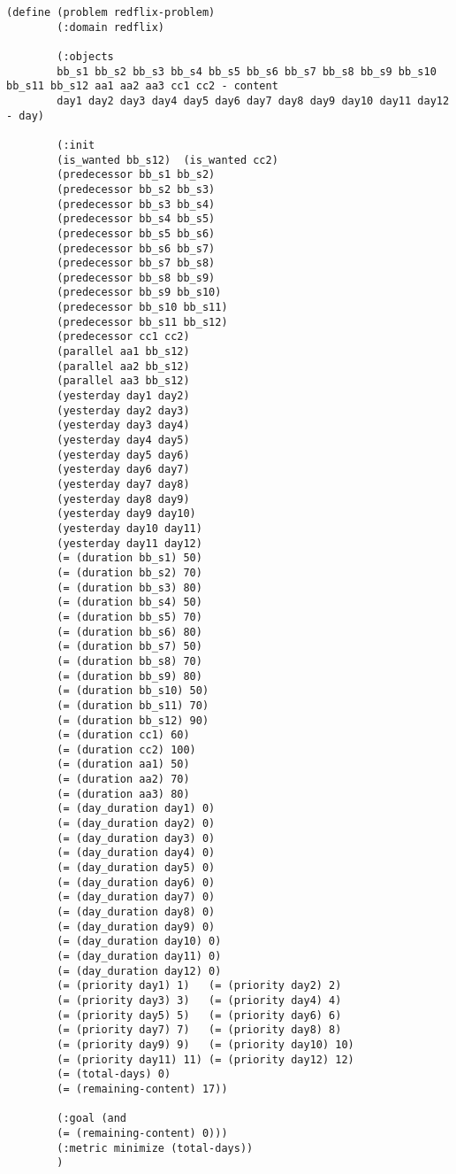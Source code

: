 \documentclass[a4paper]{article}
\begin{document}
	\begin{lstlisting}[language=PDDL, caption={Joc de Prova 1 - Extensió 4
		}, label={lst:JP14}]                     
		(define (problem redflix-problem)
		(:domain redflix)
		
		(:objects
		bb_s1 bb_s2 bb_s3 bb_s4 bb_s5 bb_s6 bb_s7 bb_s8 bb_s9 bb_s10 bb_s11 bb_s12 aa1 aa2 aa3 cc1 cc2 - content
		day1 day2 day3 day4 day5 day6 day7 day8 day9 day10 day11 day12 - day)
		
		(:init
		(is_wanted bb_s12)	(is_wanted cc2)
		(predecessor bb_s1 bb_s2)
		(predecessor bb_s2 bb_s3)
		(predecessor bb_s3 bb_s4)
		(predecessor bb_s4 bb_s5)
		(predecessor bb_s5 bb_s6)
		(predecessor bb_s6 bb_s7)
		(predecessor bb_s7 bb_s8)
		(predecessor bb_s8 bb_s9)
		(predecessor bb_s9 bb_s10)
		(predecessor bb_s10 bb_s11)
		(predecessor bb_s11 bb_s12)
		(predecessor cc1 cc2)
		(parallel aa1 bb_s12)
		(parallel aa2 bb_s12)
		(parallel aa3 bb_s12)
		(yesterday day1 day2)
		(yesterday day2 day3)
		(yesterday day3 day4)
		(yesterday day4 day5)
		(yesterday day5 day6)
		(yesterday day6 day7)
		(yesterday day7 day8)
		(yesterday day8 day9)
		(yesterday day9 day10)
		(yesterday day10 day11)
		(yesterday day11 day12)
		(= (duration bb_s1) 50)
		(= (duration bb_s2) 70)
		(= (duration bb_s3) 80)
		(= (duration bb_s4) 50)
		(= (duration bb_s5) 70)
		(= (duration bb_s6) 80)
		(= (duration bb_s7) 50)
		(= (duration bb_s8) 70)
		(= (duration bb_s9) 80)
		(= (duration bb_s10) 50)
		(= (duration bb_s11) 70)
		(= (duration bb_s12) 90)
		(= (duration cc1) 60)
		(= (duration cc2) 100)
		(= (duration aa1) 50)
		(= (duration aa2) 70)
		(= (duration aa3) 80)
		(= (day_duration day1) 0)
		(= (day_duration day2) 0)
		(= (day_duration day3) 0)
		(= (day_duration day4) 0)
		(= (day_duration day5) 0)
		(= (day_duration day6) 0)
		(= (day_duration day7) 0)
		(= (day_duration day8) 0)
		(= (day_duration day9) 0)
		(= (day_duration day10) 0)
		(= (day_duration day11) 0)
		(= (day_duration day12) 0)
		(= (priority day1) 1)	(= (priority day2) 2)
		(= (priority day3) 3)   (= (priority day4) 4)
		(= (priority day5) 5)   (= (priority day6) 6)
		(= (priority day7) 7)   (= (priority day8) 8)
		(= (priority day9) 9)   (= (priority day10) 10)
		(= (priority day11) 11) (= (priority day12) 12)
		(= (total-days) 0)
		(= (remaining-content) 17))
		
		(:goal (and
		(= (remaining-content) 0)))
		(:metric minimize (total-days))
		)
		
		
	\end{lstlisting}
	
\end{document}
